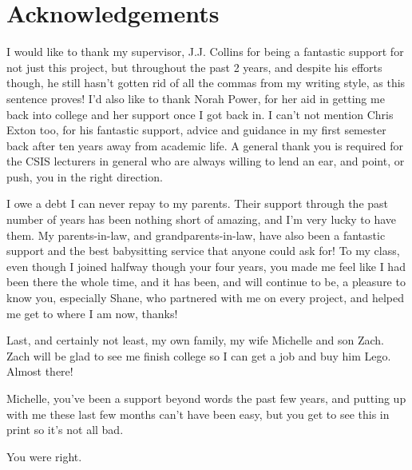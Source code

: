 \section*{Acknowledgements}    

I would like to thank my supervisor, J.J. Collins for being a fantastic support for not just this project, but throughout the past 2 years, and despite his efforts though, he still hasn't gotten rid of all the commas from my writing style, as this sentence proves! I'd also like to thank Norah Power, for her aid in getting me back into college and her support once I got back in. I can't not mention Chris Exton too, for his fantastic support, advice and guidance in my first semester back after ten years away from academic life. A general thank you is required for the CSIS lecturers in general who are always willing to lend an ear, and point, or push, you in the right direction. 

I owe a debt I can never repay to my parents. Their support through the past number of years has been nothing short of amazing, and I'm very lucky to have them. My parents-in-law, and grandparents-in-law, have also been a fantastic support and the best babysitting service that anyone could ask for! To my class, even though I joined halfway though your four years, you made me feel like I had been there the whole time, and it has been, and will continue to be, a pleasure to know you, especially Shane, who partnered with me on every project, and helped me get to where I am now, thanks!

Last, and certainly not least, my own family, my wife Michelle and son Zach. Zach will be glad to see me finish college so I can get a job and buy him Lego. Almost there!

Michelle, you've been a support beyond words the past few years, and putting up with me these last few months can't have been easy, but you get to see this in print so it's not all bad. 

You were right.